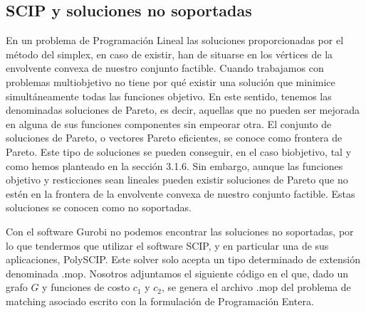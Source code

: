 \documentclass[twoside,a4paper,openright,12pt]{book}
\begin{document}
\newpage
\subsection{SCIP y soluciones no soportadas}
En un problema de Programación Lineal las soluciones proporcionadas por el método del simplex, en caso de existir, han de situarse en los vértices de la envolvente convexa de nuestro conjunto factible. Cuando trabajamos con problemas multiobjetivo no tiene por qué existir una solución que minimice simultáneamente todas las funciones objetivo. En este sentido, tenemos las denominadas soluciones de Pareto, es decir, aquellas que no pueden ser mejorada en alguna de sus funciones componentes sin empeorar otra. El conjunto de soluciones de Pareto, o vectores Pareto eficientes, se conoce como frontera de Pareto. Este tipo de soluciones se pueden conseguir, en el caso biobjetivo, tal y como hemos planteado en la sección 3.1.6. Sin embargo, aunque las funciones objetivo y resticciones sean lineales pueden existir soluciones de Pareto que no estén en la frontera de la envolvente convexa de nuestro conjunto factible. Estas soluciones se conocen como no soportadas.

Con el software Gurobi no podemos encontrar las soluciones no soportadas, por lo que tendermos que utilizar el software SCIP, y en particular una de sus aplicaciones, PolySCIP. Este solver solo acepta un tipo determinado de extensión denominada .mop. Nosotros adjuntamos el siguiente código en el que, dado un grafo $G$ y funciones de costo $c_1$ y $c_2$, se genera el archivo .mop del problema de matching asociado escrito con la formulación de Programación Entera.
\end{document}
